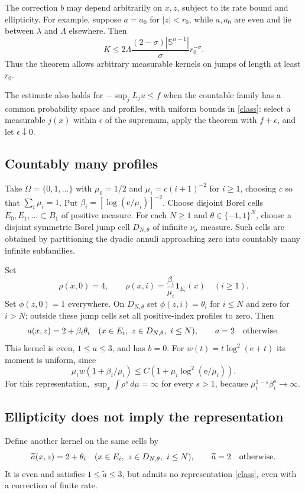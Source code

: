\documentclass{article}
\newcommand{\dd}{\,d}
\newcommand{\one}{\mathbf 1}
\begin{document}
The correction $b$ may depend arbitrarily on $x,z$, subject to its rate bound and ellipticity. For example, suppose $a=a_0$ for $|z|<r_0$, while $a,a_0$ are even and lie between $\lambda$ and $\Lambda$ elsewhere. Then
\[
 K\le2\Lambda\frac{(2-\sigma)|\mathbb S^{n-1}|}{\sigma}r_0^{-\sigma}.
\]
Thus the theorem allows arbitrary measurable kernels on jumps of length at least $r_0$.

The estimate also holds for $-\sup_jL_ju\le f$ when the countable family has a common probability space and profiles, with uniform bounds in \eqref{class}: select a measurable $j(x)$ within $\epsilon$ of the supremum, apply the theorem with $f+\epsilon$, and let $\epsilon\downarrow0$.

\subsection*{Countably many profiles}
Take $\Omega=\{0,1,\ldots\}$ with $\mu_0=1/2$ and $\mu_i=c(i+1)^{-2}$ for $i\ge1$, choosing $c$ so that $\sum_i\mu_i=1$. Put $\beta_i=[\log(\mathrm e/\mu_i)]^{-2}$. Choose disjoint Borel cells $E_0,E_1,\ldots\subset B_1$ of positive measure. For each $N\ge1$ and $\theta\in\{-1,1\}^N$, choose a disjoint symmetric Borel jump cell $D_{N,\theta}$ of infinite $\nu_\sigma$ measure. Such cells are obtained by partitioning the dyadic annuli approaching zero into countably many infinite subfamilies.

Set
\[
 \rho(x,0)=4,\qquad
 \rho(x,i)=\frac{\beta_i}{\mu_i}\one_{E_i}(x)\quad(i\ge1).
\]
Set $\phi(z,0)=1$ everywhere. On $D_{N,\theta}$ set $\phi(z,i)=\theta_i$ for $i\le N$ and zero for $i>N$; outside these jump cells set all positive-index profiles to zero. Then
\[
 a(x,z)=2+\beta_i\theta_i
 \quad(x\in E_i,\ z\in D_{N,\theta},\ i\le N),
 \qquad a=2\quad\hbox{otherwise}.
\]
This kernel is even, $1\le a\le3$, and has $b=0$. For $w(t)=t\log^2(\mathrm e+t)$ its moment is uniform, since
\[
 \mu_iw(1+\beta_i/\mu_i)
 \le C(1+\mu_i\log^2(\mathrm e/\mu_i)).
\]
For this representation, $\sup_x\int\rho^s\dd\mu=\infty$ for every $s>1$, because $\mu_i^{1-s}\beta_i^s\to\infty$.

\subsection*{Ellipticity does not imply the representation}
Define another kernel on the same cells by
\[
 \widetilde a(x,z)=2+\theta_i
 \quad(x\in E_i,\ z\in D_{N,\theta},\ i\le N),
 \qquad\widetilde a=2\quad\hbox{otherwise}.
\]
It is even and satisfies $1\le\widetilde a\le3$, but admits no representation \eqref{class}, even with a correction of finite rate.
\end{document}
